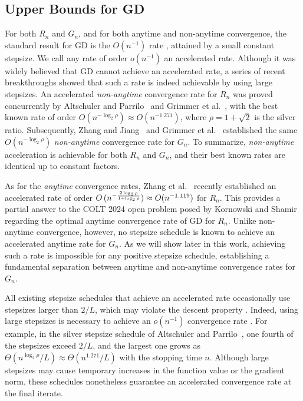\documentclass[11pt]{article}
\begin{document}
\subsection{Upper Bounds for GD}
For both $R_n$ and $G_n$, and for both anytime and non-anytime convergence, the standard result for GD is the $O(n^{-1})$ rate \cite{levitin:1966,nesterov:2018,taylor:2018}, attained by a small constant stepsize.
We call any rate of order $o(n^{-1})$ an accelerated rate.
Although it was widely believed that GD cannot achieve an accelerated rate, a series of recent breakthroughs showed that such a rate is indeed achievable by using large stepsizes.
An accelerated \emph{non-anytime} convergence rate for $R_n$ was proved concurrently by Altschuler and Parrilo~\cite{altschuler:2024b} and Grimmer et al.~\cite{grimmer:2023}, with the best known rate of order $O(n^{-\log_2\rho})\approx O(n^{-1.271})$, where $\rho=1+\sqrt{2}$ is the silver ratio.
Subsequently, Zhang and Jiang~\cite{zhang:2024} and Grimmer et al.~\cite{grimmer:2025,grimmer:2025a} established the same $O(n^{-\log_2\rho})$ \emph{non-anytime} convergence rate for $G_n$.
To summarize, \emph{non-anytime} acceleration is achievable for both $R_n$ and $G_n$, and their best known rates are identical up to constant factors.


As for the \emph{anytime} convergence rates, Zhang et al.~\cite{zhang:2025} recently established an accelerated rate of order $O\left(n^{-\smash{\frac{2\log_2\rho}{1+\log_2\rho}}}\right)\approx O(n^{-1.119})$ for $R_n$.
This provides a partial answer to the COLT 2024 open problem posed by Kornowski and Shamir~\cite{kornowski:2024} regarding the optimal anytime convergence rate of GD for $R_n$.
Unlike non-anytime convergence, however, no stepsize schedule is known to achieve an accelerated anytime rate for $G_n$.
As we will show later in this work, achieving such a rate is impossible for any positive stepsize schedule, establishing a fundamental separation between anytime and non-anytime convergence rates for $G_n$.






All existing stepsize schedules that achieve an accelerated rate occasionally use stepsizes larger than $2/L$, which may violate the descent property \cite{altschuler:2024b,grimmer:2023,grimmer:2025,grimmer:2025a,zhang:2024,zhang:2025}.
Indeed, using large stepsizes is necessary to achieve an $o(n^{-1})$ convergence rate \cite{das-gupta:2024,kornowski:2024}.
For example, in the silver stepsize schedule of Altschuler and Parrilo~\cite{altschuler:2024b}, one fourth of the stepsizes exceed $2/L$, and the largest one grows as $\Theta(n^{\log_2\rho}/L) \approx \Theta(n^{1.271}/L)$ with the stopping time $n$.
Although large stepsizes may cause temporary increases in the function value or the gradient norm, these schedules nonetheless guarantee an accelerated convergence rate at the final iterate.
\end{document}
